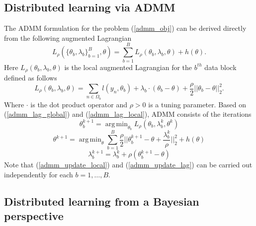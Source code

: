 \documentclass{article}
\DeclareMathOperator*{\argmin}{arg\,min}
\newcommand{\1}[0]{\ensuremath{\boldsymbol{1}}\xspace}
\begin{document}
\subsection{Distributed learning via ADMM}

The ADMM formulation for the problem (\ref{admm_obj}) can be derived directly from the following augmented Lagrangian
\begin{equation}\label{admm_lag_global}
L_\rho(\{\theta_b, \lambda_b\}_{b=1}^B, \theta) =  \sum_{b=1}^BL_\rho(\theta_b, \lambda_b, \theta) + h(\theta).
\end{equation}
Here $L_\rho(\theta_b, \lambda_b, \theta)$ is the local augmented Lagrangian for the $b^{th}$ data block defined as follows
\begin{equation}\label{admm_lag_local}
L_\rho(\theta_b, \lambda_b, \theta)  = \sum_{n\in\Omega_b}l(y_n, \theta_b) + \lambda_b\cdot(\theta_b - \theta) + \frac{\rho}{2}||\theta_b - \theta||_2^2.
\end{equation}
Where $\cdot$ is the dot product operator and $\rho > 0$ is a tuning parameter. Based on (\ref{admm_lag_global}) and (\ref{admm_lag_local}), ADMM consists of the iterations
\begin{equation}\label{admm_update_local}
\theta_b^{k+1} = \argmin_{\theta_b}L_\rho(\theta_b, \lambda_b^k, \theta^k)
\end{equation}
\begin{equation}\label{admm_update_global}
\theta^{k+1} = \argmin_\theta\sum_{b=1}^B\frac{\rho}{2}||\theta_b^{k+1} - \theta + \frac{\lambda_b^k}{\rho}||_2^2 + h(\theta)
\end{equation}
\begin{equation}\label{admm_update_lag}
\lambda_b^{k+1} = \lambda_b^k + \rho(\theta_b^{k+1} - \theta)
\end{equation}
Note that (\ref{admm_update_local}) and (\ref{admm_update_lag}) can be carried out independently for each $b = 1, \ldots, B$.

\subsection{Distributed learning from a Bayesian perspective }
\end{document}
